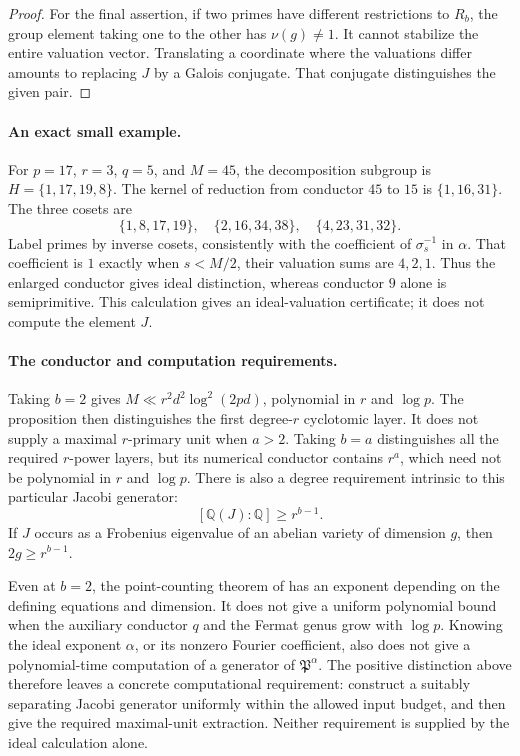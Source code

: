 \documentclass[11pt]{article}
\theoremstyle{definition}
\theoremstyle{remark}
\begin{document}
\begin{proof}
For the final assertion, if two primes have different
restrictions to \(R_b\), the group element taking one to the
other has \(\nu(g)\ne1\). It cannot stabilize the entire
valuation vector. Translating a coordinate where the valuations
differ amounts to replacing \(J\) by a Galois conjugate.
That conjugate distinguishes the given pair.
\end{proof}

\paragraph{An exact small example.}
For \(p=17\), \(r=3\), \(q=5\), and \(M=45\), the decomposition
subgroup is \(H=\{1,17,19,8\}\). The kernel of reduction from
conductor \(45\) to \(15\) is \(\{1,16,31\}\).
The three cosets are
\[
 \{1,8,17,19\},\quad
 \{2,16,34,38\},\quad
 \{4,23,31,32\}.
\]
Label primes by inverse cosets, consistently with the coefficient
of \(\sigma_s^{-1}\) in \(\alpha\). That coefficient is
\(1\) exactly when \(s<M/2\), their valuation sums are
\(4,2,1\). Thus the enlarged conductor gives
ideal distinction, whereas conductor \(9\) alone is semiprimitive.
This calculation gives an ideal-valuation certificate; it does
not compute the element \(J\).

\paragraph{The conductor and computation requirements.}
Taking \(b=2\) gives
\(M\ll r^2d^2\log^2(2pd)\), polynomial in \(r\) and \(\log p\).
The proposition then distinguishes the first degree-\(r\)
cyclotomic layer. It does not supply a maximal \(r\)-primary unit
when \(a>2\).
Taking \(b=a\) distinguishes all the required \(r\)-power layers,
but its numerical conductor contains \(r^a\), which need not be
polynomial in \(r\) and \(\log p\).
There is also a degree requirement intrinsic to this particular
Jacobi generator:
\[
 [\mathbb Q(J):\mathbb Q]\geq r^{b-1}.
\]
If \(J\) occurs as a Frobenius eigenvalue of an abelian variety
of dimension \(g\), then \(2g\geq r^{b-1}\).

Even at \(b=2\), the point-counting theorem of
\citet[Theorem~A, author p.~1]{Pila1990} has an exponent depending
on the defining equations and dimension. It does not give a
uniform polynomial bound when the auxiliary conductor \(q\)
and the Fermat genus grow with \(\log p\).
Knowing the ideal exponent \(\alpha\), or its nonzero Fourier
coefficient, also does not give a polynomial-time computation
of a generator of \(\mathfrak P^\alpha\).
The positive distinction above therefore leaves a concrete
computational requirement: construct a suitably separating
Jacobi generator uniformly within the allowed input budget,
and then give the required maximal-unit extraction.
Neither requirement is supplied by the ideal calculation alone.
\end{document}
